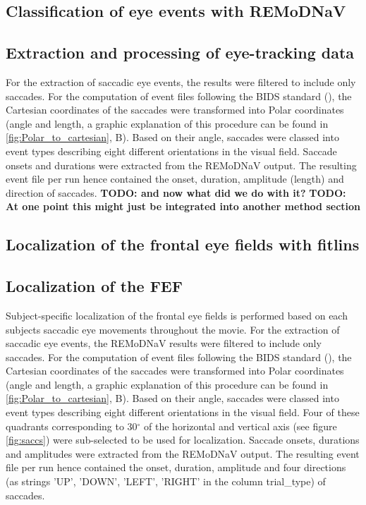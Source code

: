 \documentclass[a4paper, 12pt]{scrreprt}
\begin{document}
\subsection{Classification of eye events with REMoDNaV}

\subsection{Extraction and processing of eye-tracking data}

For the extraction of saccadic eye events, the results were filtered to include only saccades. For the computation of event files following the BIDS standard (\cite{gorgolewski2016brain}), the Cartesian coordinates of the saccades were transformed into Polar coordinates (angle and length, a graphic explanation of this procedure can be found in \ref{fig:Polar_to_cartesian}, B). Based on their angle, saccades were classed into event types describing eight different orientations in the visual field. Saccade onsets and durations were extracted from the REMoDNaV output. The resulting event file per run hence contained the onset, duration, amplitude (length) and direction of saccades. \newline \textbf{TODO: and now what did we do with it?}
\textbf{TODO: At one point this might just be integrated into another method section}

\subsection{Localization of the frontal eye fields with fitlins}

\subsection{Localization of the FEF}
Subject-specific localization of the frontal eye fields is performed based on each subjects saccadic eye movements throughout the movie. For the extraction of saccadic eye events, the REMoDNaV results were filtered to include only saccades. For the computation of event files following the BIDS standard (\cite{gorgolewski2016brain}), the Cartesian coordinates of the saccades were transformed into Polar coordinates (angle and length, a graphic explanation of this procedure can be found in \ref{fig:Polar_to_cartesian}, B). Based on their angle, saccades were classed into event types describing eight different orientations in the visual field. Four of these quadrants corresponding to 30$^\circ$ of the horizontal and vertical axis (see figure \ref{fig:saccs}) were sub-selected to be used for localization. Saccade onsets, durations and amplitudes were extracted from the REMoDNaV output. The resulting event file per run hence contained the onset, duration, amplitude and four directions (as strings 'UP', 'DOWN', 'LEFT', 'RIGHT' in the column trial\_type) of saccades.
\end{document}
